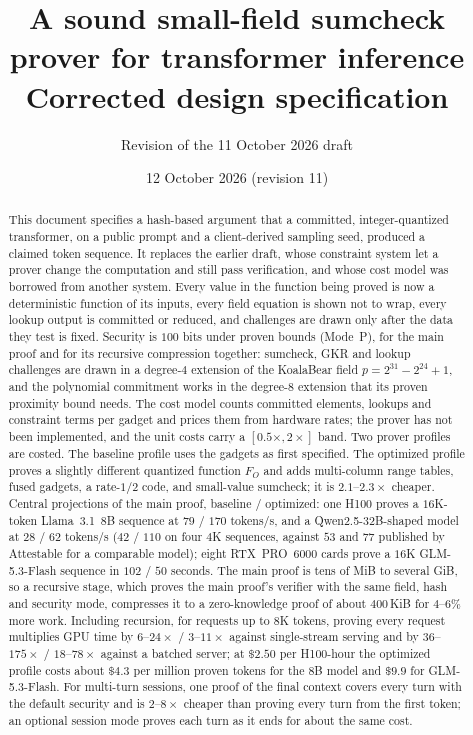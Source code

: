 \documentclass[11pt]{article}
\title{A sound small-field sumcheck prover for transformer inference\\[2pt]
\large Corrected design specification}
\author{Revision of the 11 October 2026 draft}
\date{12 October 2026 (revision 11)}
\begin{document}
\maketitle

\begin{abstract}
\noindent
This document specifies a hash-based argument that a committed, integer-quantized transformer, on a public prompt and a client-derived sampling seed, produced a claimed token sequence.
It replaces the earlier draft, whose constraint system let a prover change the computation and still pass verification, and whose cost model was borrowed from another system.
Every value in the function being proved is now a deterministic function of its inputs, every field equation is shown not to wrap, every lookup output is committed or reduced, and challenges are drawn only after the data they test is fixed.
Security is \(100\) bits under proven bounds (Mode~P), for the main proof and for its recursive compression together: sumcheck, GKR and lookup challenges are drawn in a degree-\(4\) extension of the KoalaBear field \(p = 2^{31} - 2^{24} + 1\), and the polynomial commitment works in the degree-\(8\) extension that its proven proximity bound needs.
The cost model counts committed elements, lookups and constraint terms per gadget and prices them from hardware rates; the prover has not been implemented, and the unit costs carry a \([0.5\times, 2\times]\) band.
Two prover profiles are costed.
The baseline profile uses the gadgets as first specified.
The optimized profile proves a slightly different quantized function \(F_O\) and adds multi-column range tables, fused gadgets, a rate-\(1/2\) code, and small-value sumcheck; it is \(2.1\)--\(2.3\times\) cheaper.
Central projections of the main proof, baseline / optimized: one H100 proves a \(16\)K-token Llama~3.1~8B sequence at \(79\) / \(170\) tokens/s, and a Qwen2.5-32B-shaped model at \(28\) / \(62\) tokens/s (\(42\) / \(110\) on four \(4\)K sequences, against \(53\) and \(77\) published by Attestable for a comparable model); eight RTX~PRO~6000 cards prove a \(16\)K GLM-5.3-Flash sequence in \(102\) / \(50\) seconds.
The main proof is tens of MiB to several GiB, so a recursive stage, which proves the main proof's verifier with the same field, hash and security mode, compresses it to a zero-knowledge proof of about \(400\)\,KiB for \(4\)--\(6\%\) more work.
Including recursion, for requests up to \(8\)K tokens, proving every request multiplies GPU time by \(6\)--\(24\times\) / \(3\)--\(11\times\) against single-stream serving and by \(36\)--\(175\times\) / \(18\)--\(78\times\) against a batched server; at \(\$2.50\) per H100-hour the optimized profile costs about \(\$4.3\) per million proven tokens for the 8B model and \(\$9.9\) for GLM-5.3-Flash.
For multi-turn sessions, one proof of the final context covers every turn with the default security and is \(2\)--\(8\times\) cheaper than proving every turn from the first token; an optional session mode proves each turn as it ends for about the same cost.
\end{abstract}
\end{document}
